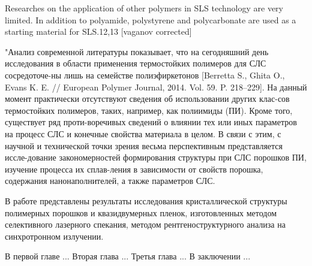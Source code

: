 	Researches on the application of other polymers in SLS technology are very limited. In addition to polyamide, polystyrene and polycarbonate are used as a starting material for SLS.12,13
	[vaganov corrected]
	
	"Анализ современной литературы показывает, что на сегодняшний день исследования в области применения термостойких полимеров для СЛС сосредоточе-ны лишь на семействе полиэфиркетонов [Berretta S., Ghita O., Evans K. E. // European Polymer Journal, 2014. Vol. 59. P. 218–229]. На данный момент практически отсутствуют сведения об использовании других клас-сов термостойких полимеров, таких, например, как полиимиды (ПИ). Кроме того, существует ряд проти-воречивых сведений о влиянии тех или иных параметров на процесс СЛС и конечные свойства материала в целом. В связи с этим, с научной и технической точки зрения весьма перспективным представляется иссле-дование закономерностей формирования структуры при СЛС порошков ПИ, изучение процесса их сплав-ления в зависимости от свойств порошка, содержания нанонаполнителей, а также параметров СЛС.
\cite{yudin-red}
	


В работе представлены результаты исследования кристаллической структуры полимерных порошков и квазидвумерных пленок, изготовленных методом селективного лазерного спекания, методом рентгеноструктурного анализа на синхротронном излучении.


В первой главе ...
Вторая глава ...
Третья глава ...
В заключении ...

